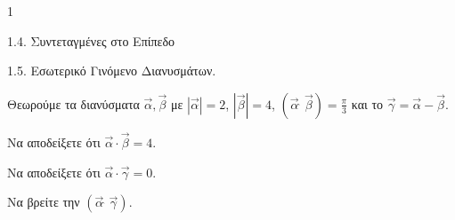 \begin{ylh}{1}
    \item 1.4. Συντεταγμένες στο Επίπεδο
    \item 1.5. Εσωτερικό Γινόμενο Διανυσμάτων.
\end{ylh}
Θεωρούμε τα διανύσματα $\vec{\alpha}, \vec{\beta}$ με $|\vec{\alpha}|=2$, $|\vec{\beta}|=4$, $(\vec{\alpha} \widehat{\phantom{,}} \vec{\beta}) = \frac{\pi}{3}$ και το $\vec{\gamma} = \vec{\alpha} - \vec{\beta}$.
\begin{alist}
\item Να αποδείξετε ότι $\vec{\alpha} \cdot \vec{\beta} = 4$. 
\item Να αποδείξετε ότι $\vec{\alpha} \cdot \vec{\gamma} = 0$. 
\item Να βρείτε την $(\vec{\alpha} \widehat{\phantom{,}} \vec{\gamma})$. 
\end{alist}